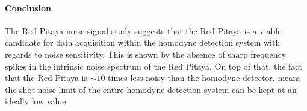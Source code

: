 \paragraph{Conclusion}

The Red Pitaya noise signal study suggests that the Red Pitaya is a viable candidate for data acquisition within the homodyne detection system with regards to noise sensitivity. This is shown by the absence of sharp frequency spikes in the intrinsic noise spectrum of the Red Pitaya. On top of that, the fact that the Red Pitaya is $\sim 10$ times less noisy than the homodyne detector, means the shot noise limit of the entire homodyne detection system can be kept at an ideally low value.